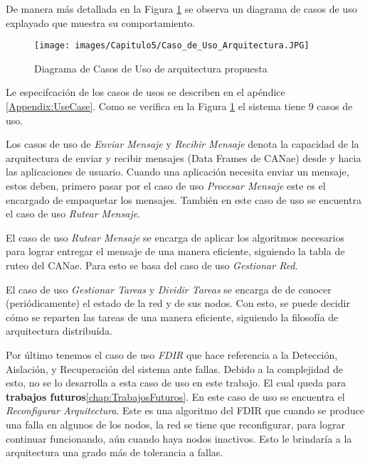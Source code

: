 De manera más detallada en la Figura \ref{fig:DiagramaCUArqPropuesta} se
observa un diagrama de casos de uso explayado que muestra su comportamiento.

\begin{figure}[h!]
 \centering
 \texttt{[image: images/Capitulo5/Caso\_de\_Uso\_Arquitectura.JPG]}
  \caption{Diagrama de Casos de Uso de arquitectura propuesta}
\label{fig:DiagramaCUArqPropuesta}
\end{figure} 

Le especifcación de los casos de usos se describen en el apéndice \ref{Appendix:UseCase}.
Como se verifica en la Figura \ref{fig:DiagramaCUArqPropuesta}
el sistema tiene 9 casos de uso.

Los casos de uso de \textit{Enviar Mensaje} y \textit{Recibir Mensaje} denota la
capacidad de la arquitectura de enviar y recibir mensajes (Data Frames de
CANae) desde y hacia las aplicaciones de usuario. Cuando una aplicación
necesita enviar un mensaje, estos deben, primero pasar por el caso de uso
\textit{Procesar Mensaje} este es el encargado de empaquetar los mensajes.
También en este caso de uso se encuentra el caso de uso \textit{Rutear
  Mensaje}.

El caso de uso \textit{Rutear Mensaje} se encarga de aplicar los algoritmos
necesarios para lograr entregar el mensaje de una manera eficiente, siguiendo
la tabla de ruteo del CANae. Para esto se basa del caso de uso \textit{Gestionar
  Red}.

El caso de uso \textit{Gestionar Tareas} y \textit{Dividir Tareas} se encarga de
de conocer (periódicamente) el estado de la red y de sus nodos. Con esto, se puede
decidir cómo se reparten las tareas de una manera eficiente, siguiendo
la filosofía de arquitectura distribuída.

Por último tenemos el caso de uso \textit{FDIR} que hace referencia a la
Detección, Aislación, y Recuperación del sistema ante fallas. Debido a la
complejidad de esto, no se lo desarrolla a esta caso de uso en este trabajo.
El cual queda para \textbf{trabajos futuros}\ref{chap:TrabajosFuturos}. En este
caso de uso se encuentra el \textit{Reconfigurar Arquitectura}. Este es una
algoritmo del \ac{FDIR} que cuando se produce una falla en algunos de los
nodos, la red se tiene que reconfigurar, para lograr continuar funcionando,
aún cuando haya nodos inactivos. Esto le brindaría a la arquitectura una grado
más de tolerancia a fallas. 



